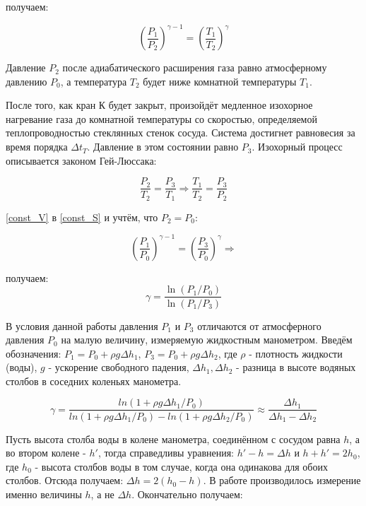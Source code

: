 \documentclass[15pt,a5paper,reqno]{article}
\begin{document}
	 получаем:
	
	\begin{equation}\label{const_S}
	    \left(\frac{P_1}{P_2}\right)^{\gamma - 1} = \left(\frac{T_1}{T_2}\right)^{\gamma}
	\end{equation}
	
	Давление $P_2$ после адиабатического расширения газа равно атмосферному давлению $P_0$, а температура $T_2$ будет ниже комнатной температуры $T_1$.
	
	После того, как кран К будет закрыт, произойдёт медленное изохорное нагревание газа до комнатной температуры со скоростью, определяемой теплопроводностью стеклянных стенок сосуда. Система достигнет равновесия за время порядка $\Delta t_T$. Давление в этом состоянии равно $P_3$. Изохорный процесс описывается законом Гей-Люссака:
	
	\begin{equation}\label{const_V}
	    \frac{P_2}{T_2} = \frac{P_3}{T_1} \Rightarrow \frac{T_1}{T_2} = \frac{P_3}{P_2}
	\end{equation}
	
	 \eqref{const_V} в \eqref{const_S} и учтём, что $P_2 = P_0$:
	
	\begin{equation}
	    \left(\frac{P_1}{P_0}\right)^{\gamma - 1} = \left(\frac{P_3}{P_0}\right)^{\gamma} \Rightarrow
	\end{equation}
	
	 получаем:
	\begin{equation}
	    \gamma = \frac{\ln{(P_1/P_0)}}{\ln{(P_1/P_3)}}
	\end{equation}
	
	В условия данной работы давления $P_1$ и $P_3$ отличаются от атмосферного давления $P_0$ на малую величину, измеряемую жидкостным манометром. Введём обозначения: $P_1 = P_0 + \rho g\Delta h_1$, $P_3 = P_0 + \rho g\Delta h_2$, где $\rho$ - плотность жидкости (воды), $g$ - ускорение свободного падения, $\Delta h_1, \Delta h_2$ - разница в высоте водяных столбов в соседних коленьях манометра.
	
	\begin{equation}
	    \gamma = \frac{ln{(1 + \rho g\Delta h_1/P_0)}}{ln{(1 + \rho g\Delta h_1/P_0)} - ln{(1 + \rho g\Delta h_2/P_0)}} \approx \frac{\Delta h_1}{\Delta h_1 - \Delta h_2}
	\end{equation}
	
	Пусть высота столба воды в колене манометра, соединённом с сосудом равна $h$, а во втором колене - $h'$, тогда справедливы уравнения: $h' - h = \Delta h$ и $h + h' = 2h_0$, где $h_0$ - высота столбов воды в том случае, когда она одинакова для обоих столбов. Отсюда получаем: $\Delta h = 2(h_0 - h)$. В работе производилось измерение именно величины $h$, а не $\Delta h$. Окончательно получаем:
	
\end{document}
